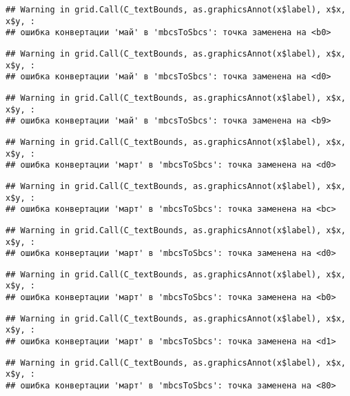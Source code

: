 \documentclass[
]{article}
\begin{document}
\begin{verbatim}
## Warning in grid.Call(C_textBounds, as.graphicsAnnot(x$label), x$x, x$y, :
## ошибка конвертации 'май' в 'mbcsToSbcs': точка заменена на <b0>
\end{verbatim}

\begin{verbatim}
## Warning in grid.Call(C_textBounds, as.graphicsAnnot(x$label), x$x, x$y, :
## ошибка конвертации 'май' в 'mbcsToSbcs': точка заменена на <d0>
\end{verbatim}

\begin{verbatim}
## Warning in grid.Call(C_textBounds, as.graphicsAnnot(x$label), x$x, x$y, :
## ошибка конвертации 'май' в 'mbcsToSbcs': точка заменена на <b9>
\end{verbatim}

\begin{verbatim}
## Warning in grid.Call(C_textBounds, as.graphicsAnnot(x$label), x$x, x$y, :
## ошибка конвертации 'март' в 'mbcsToSbcs': точка заменена на <d0>
\end{verbatim}

\begin{verbatim}
## Warning in grid.Call(C_textBounds, as.graphicsAnnot(x$label), x$x, x$y, :
## ошибка конвертации 'март' в 'mbcsToSbcs': точка заменена на <bc>
\end{verbatim}

\begin{verbatim}
## Warning in grid.Call(C_textBounds, as.graphicsAnnot(x$label), x$x, x$y, :
## ошибка конвертации 'март' в 'mbcsToSbcs': точка заменена на <d0>
\end{verbatim}

\begin{verbatim}
## Warning in grid.Call(C_textBounds, as.graphicsAnnot(x$label), x$x, x$y, :
## ошибка конвертации 'март' в 'mbcsToSbcs': точка заменена на <b0>
\end{verbatim}

\begin{verbatim}
## Warning in grid.Call(C_textBounds, as.graphicsAnnot(x$label), x$x, x$y, :
## ошибка конвертации 'март' в 'mbcsToSbcs': точка заменена на <d1>
\end{verbatim}

\begin{verbatim}
## Warning in grid.Call(C_textBounds, as.graphicsAnnot(x$label), x$x, x$y, :
## ошибка конвертации 'март' в 'mbcsToSbcs': точка заменена на <80>
\end{verbatim}
\end{document}
